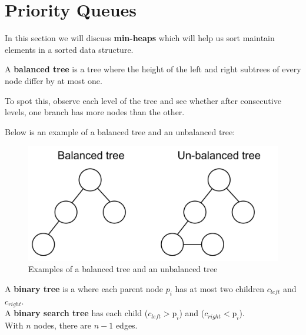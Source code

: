 \section{Priority Queues}
In this section we will discuss \textbf{min-heaps} which will help us sort
maintain elements in a sorted data structure.

\label{sec:priority}
\begin{Def}

    A \textbf{balanced tree} is a tree where the height of the left and right subtrees of every node differ by at most one.
\end{Def}

\begin{Tip}
    To spot this, observe each level of the tree and see whether after consecutive levels, one branch has more nodes than the other.
\end{Tip}
\newpage
\noindent
Below is an example of a balanced tree and an unbalanced tree:

\begin{figure}[h!]
    \centering
    \includegraphics[width=.6\textwidth]{./Sections/sched/priority/tree.png}
    \caption{Examples of a balanced tree and an unbalanced tree}
    \label{fig:balanced_unbalanced_trees}
\end{figure}
\begin{Def}

    A \textbf{binary tree} is a where each parent node $p_i$ has at most two children $c_{left}$ and $c_{right}$.\\
    A \textbf{binary search tree} has each child ($c_{left} > \text{p}_{i}$) and ($c_{right} < \text{p}_{i}$).\\

    \noindent
    With $n$ nodes, there are $n-1$ edges.
\end{Def}

